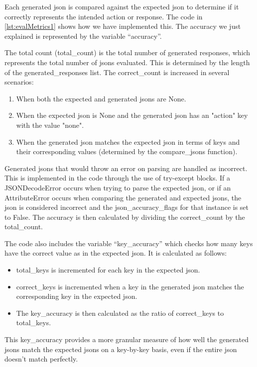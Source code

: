 Each generated \gls{json} is compared against the expected \gls{json} to determine if it correctly represents the intended action or response. 
The code in \cref{lst:evalMetrics1} shows how we have implemented this. The accuracy we just explained is represented by the variable ``accuracy''.

The total count (total\_count) is the total number of generated responses, which represents the total number of \glspl{json} evaluated. This is determined by the length of the generated\_responses list.
The correct\_count is increased in several scenarios:
\begin{enumerate}
    \item When both the expected and generated \glspl{json} are None.
    \item When the expected \gls{json} is None and the generated \gls{json} has an "action" key with the value "none".
    \item When the generated \gls{json} matches the expected \gls{json} in terms of keys and their corresponding values (determined by the compare\_jsons function).
\end{enumerate}
Generated \glspl{json} that would throw an error on parsing are handled as incorrect. This is implemented in the code through the use of try-except blocks. If a JSONDecodeError occurs when trying to parse the expected \gls{json}, or if an AttributeError occurs when comparing the generated and expected \glspl{json}, the \gls{json} is considered incorrect and the json\_accuracy\_flags for that instance is set to False.
The accuracy is then calculated by dividing the correct\_count by the total\_count.

The code also includes the variable ``key\_accuracy'' which checks how many keys have the correct value as in the expected \gls{json}. It is calculated as follows:
\begin{itemize}
    \item total\_keys is incremented for each key in the expected \gls{json}.
    \item correct\_keys is incremented when a key in the generated \gls{json} matches the corresponding key in the expected \gls{json}.
    \item The key\_accuracy is then calculated as the ratio of correct\_keys to total\_keys.
\end{itemize}
This key\_accuracy provides a more granular measure of how well the generated \glspl{json} match the expected \glspl{json} on a key-by-key basis, even if the entire \gls{json} doesn't match perfectly.

